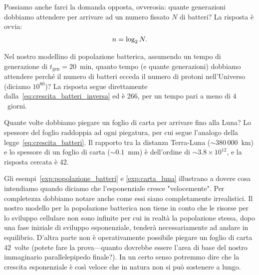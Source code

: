 \begin{figure}[!ht]
\end{figure}

Possiamo anche farci la domanda opposta, ovverosia: quante generazioni
dobbiamo attendere per arrivare ad un numero fissato $N$ di batteri? La risposta
è ovvia:
\begin{align}\label{eq:crescita_batteri_inversa}
  n = \llog[2]N.
\end{align}

\begin{examplebox}
  \begin{example}\label{exp:popolazione_batteri}
    Nel nostro modellino di popolazione batterica, assumendo un tempo di
    generazione di $t_\text{gen} = 20$~min, quanto tempo (e quante generazioni)
    dobbiamo attendere perché il numero di batteri ecceda il numero
    di protoni nell'Universo (diciamo $10^{80}$)? La risposta segue direttamente
    dalla~\eqref{eq:crescita_batteri_inversa} ed è 266, per un tempo pari
    a meno di $4$~giorni.
  \end{example}

  \begin{example}\label{exp:carta_luna}
    Quante volte dobbiamo piegare un foglio di carta per arrivare fino alla
    Luna? Lo spessore del foglio raddoppia ad ogni piegatura, per cui segue
    l'analogo della legge~\eqref{eq:crescita_batteri}. Il rapporto tra la
    distanza Terra-Luna ($\sim 380\,000$~km) e lo spessore di un foglio di carta
    ($\sim 0.1$~mm) è dell'ordine di $\sim 3.8 \times 10^{12}$, e la risposta
    cercata è 42.
  \end{example}
\end{examplebox}

Gli esempi~\ref{exp:popolazione_batteri} e \ref{exp:carta_luna} illustrano
a dovere cosa intendiamo quando diciamo che l'esponenziale cresce
"velocemente". Per completezza dobbiamo notare anche come essi siano
completamente irrealistici. Il nostro modello per la popolazione batterica non
tiene in conto che le risorse per lo sviluppo cellulare non sono infinite per
cui in realtà la popolazione stessa, dopo una fase iniziale di sviluppo
esponenziale, tenderà necessariamente ad andare in equilibrio. D'altra parte
non è operativamente possibile piegare un foglio di carta $42$~volte
(potete fare la prova---quanto dovrebbe essere l'area di base del nostro
immaginario parallelepipedo finale?). In un certo senso potremmo dire che la
crescita esponenziale è così veloce che in natura non si può sostenere
a lungo.


